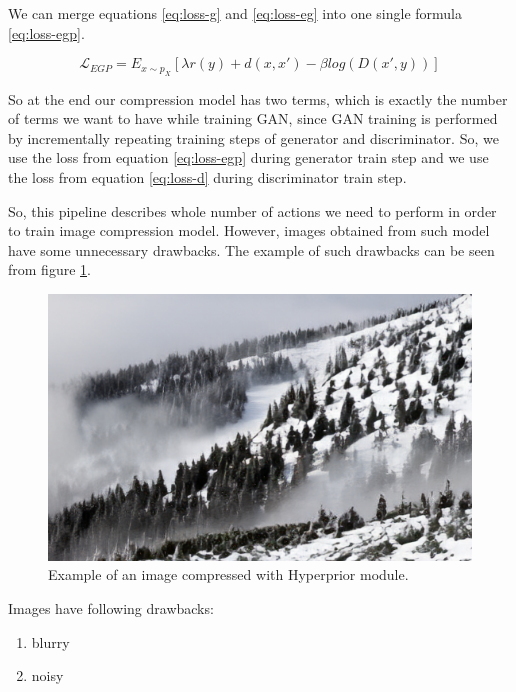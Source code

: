 We can merge equations \ref{eq:loss-g} and \ref{eq:loss-eg} into one single formula \ref{eq:loss-egp}.

\begin{equation}
    \label{eq:loss-egp}
    \mathcal{L}_{EGP}=E_{x\sim p_X}[\lambda r(y)+d(x, x')-\beta log(D(x',y))]
\end{equation}

So at the end our compression model has two terms, which is exactly the number of terms we want to have while training GAN, since GAN training is performed by incrementally repeating training steps of generator and discriminator. So, we use the loss from equation \ref{eq:loss-egp} during generator train step and we use the loss from equation \ref{eq:loss-d} during discriminator train step.

So, this pipeline describes whole number of actions we need to perform in order to train image compression model. However, images obtained from such model have some unnecessary drawbacks. The example of such drawbacks can be seen from figure \ref{forest-blurry}.

\begin{figure}[!ht]
    \centering
    \includegraphics[width=\textwidth]{figure/forest-blurry.png}
    \caption{Example of an image compressed with Hyperprior module.}
    \label{forest-blurry}
\end{figure}

Images have following drawbacks:

\begin{enumerate}
    \item blurry
    \item noisy
\end{enumerate}

